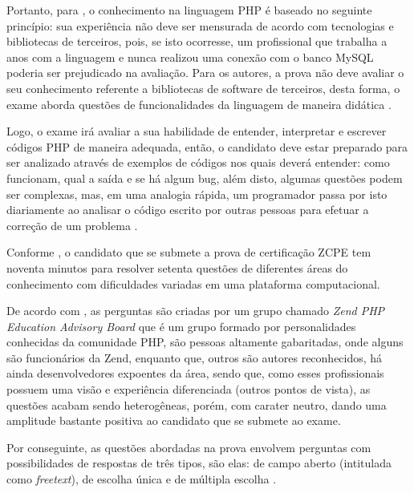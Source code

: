 Portanto, para , o
conhecimento na linguagem \acs{PHP} é baseado no seguinte princípio: sua
experiência não deve ser mensurada de acordo com tecnologias
e bibliotecas de terceiros, pois, se isto ocorresse, um profissional que
trabalha a anos com a linguagem e nunca realizou uma conexão com o banco 
\acs{MySQL} poderia ser prejudicado na avaliação. Para os autores, a
prova não deve avaliar o seu conhecimento referente a bibliotecas de software
de terceiros, desta forma, o exame aborda questões de funcionalidades da 
linguagem  de maneira didática \cite{theZendPHPCertificationPracticeTestBook}.

Logo, o exame irá avaliar a sua habilidade de
entender, interpretar e escrever códigos \acs{PHP} de maneira adequada, então,
o candidato deve estar preparado para ser analizado através de exemplos de
códigos nos quais deverá entender: como funcionam, qual a saída e se há algum \acs{bug},
além disto, algumas questões podem ser complexas, mas, em uma analogia rápida,
um programador passa por isto diariamente ao analisar o código escrito por 
outras pessoas para efetuar a correção de um problema
\cite{theZendPHPCertificationPracticeTestBook}.

Conforme , o candidato que
se submete a prova de certificação \acs{ZCPE} tem noventa minutos para resolver 
setenta questões de diferentes áreas do conhecimento com dificuldades variadas
em uma plataforma computacional.

De acordo com , as perguntas são criadas por
um grupo chamado \textit{Zend PHP Education Advisory Board} que é um grupo formado por 
personalidades conhecidas da comunidade \acs{PHP}, são pessoas altamente
gabaritadas, onde alguns são funcionários da \acs{Zend}, enquanto que, outros são autores
reconhecidos,  há ainda desenvolvedores expoentes da área, sendo que, como esses
profissionais possuem uma visão e experiência diferenciada (outros pontos de 
vista), as questões acabam sendo heterogêneas, porém, com carater neutro, dando 
uma amplitude bastante positiva ao candidato que se submete ao exame.

Por conseguinte, as questões abordadas na prova envolvem perguntas com
possibilidades de respostas de três tipos, são elas: de campo aberto (intitulada
como \textit{freetext}), de escolha única e de múltipla escolha
\cite{entrevistaAriZCEBrasil}.

